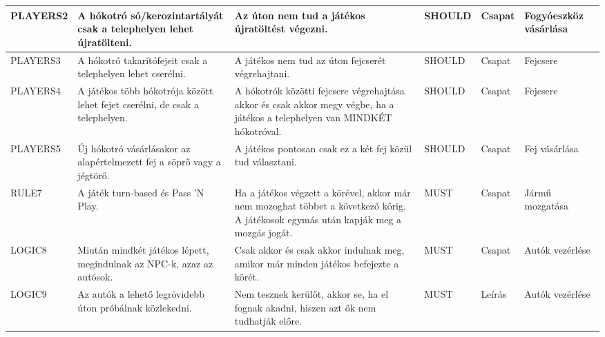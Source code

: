\begin{longtable}{| p{2cm} | p{4cm} | p{2.7cm} | p{2cm} | p{1.5cm} | p{2.0cm}|}
    PLAYERS2 & %
    A hókotró só/kerozintartályát csak a telephelyen lehet újratölteni. & %
    Az úton nem tud a játékos újratöltést végezni. & %
    SHOULD & %
    Csapat & %
    Fogyóeszköz vásárlása \\ %
    \hline

    PLAYERS3 & %
    A hókotró takarítófejeit csak a telephelyen lehet cserélni. & %
    A játékos nem tud az úton fejcserét végrehajtani. & %
    SHOULD & %
    Csapat & %
    Fejcsere \\ %
    \hline

    PLAYERS4 & %
    A játékos több hókotrója között lehet fejet cserélni, de csak a telephelyen. & %
    A hókotrók közötti fejcsere végrehajtása akkor és csak akkor megy végbe, ha a játékos a telephelyen van MINDKÉT hókotróval.  & %
    SHOULD & %
    Csapat & %
    Fejcsere \\ %
    \hline

    PLAYERS5 & %
    Új hókotró vásárlásakor az alapértelmezett fej a söprő vagy a jégtörő. & %
    A játékos pontosan csak ez a két fej közül tud választani. & %
    SHOULD & %
    Csapat & %
    Fej vásárlása \\ %
    \hline

    RULE7 & %
    A játék turn-based és Pass 'N Play. & %
    Ha a játékos végzett a körével, akkor már nem mozoghat többet a következő körig. A játékosok egymás után kapják meg a mozgás jogát. & %
    MUST & %
    Csapat & %
    Jármű mozgatása \\ %
    \hline

    LOGIC8 & %
    Miután mindkét játékos lépett, megindulnak az NPC-k, azaz az autósok. & %
    Csak akkor és csak akkor indulnak meg, amikor már minden játékos befejezte a körét. & %
    MUST & %
    Csapat & %
    Autók vezérlése \\ %
    \hline
    
    
    LOGIC9 & %
    Az autók a lehető legrövidebb úton próbálnak közlekedni. & %
    Nem tesznek kerülőt, akkor se, ha el fognak akadni, hiszen azt ők nem tudhatják előre. & %
    MUST & %
    Leírás & %
    Autók vezérlése \\ %
    \hline


\end{longtable}

